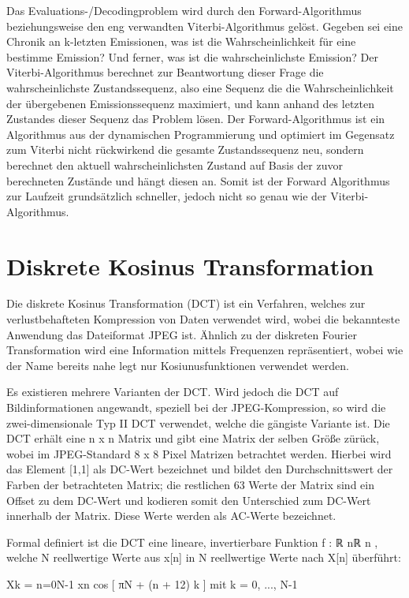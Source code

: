 Das Evaluations-/Decodingproblem wird durch den Forward-Algorithmus beziehungsweise den eng verwandten Viterbi-Algorithmus gelöst. Gegeben sei eine Chronik an k-letzten Emissionen, was ist die Wahrscheinlichkeit für eine bestimme Emission? Und ferner, was ist die wahrscheinlichste Emission? Der Viterbi-Algorithmus berechnet zur Beantwortung dieser Frage die wahrscheinlichste Zustandssequenz, also eine Sequenz die die Wahrscheinlichkeit der übergebenen Emissionssequenz maximiert, und kann anhand des letzten Zustandes dieser Sequenz das Problem lösen. Der Forward-Algorithmus ist ein Algorithmus aus der dynamischen Programmierung und optimiert im Gegensatz zum Viterbi nicht rückwirkend die gesamte Zustandssequenz neu, sondern berechnet den aktuell wahrscheinlichsten Zustand auf Basis der zuvor berechneten Zustände und hängt diesen an. Somit ist der Forward Algorithmus zur Laufzeit grundsätzlich schneller, jedoch nicht so genau wie der Viterbi-Algorithmus.

\section{Diskrete Kosinus Transformation}

Die diskrete Kosinus Transformation (DCT) ist ein Verfahren, welches zur verlustbehafteten Kompression von Daten verwendet wird, wobei die bekannteste Anwendung das Dateiformat JPEG ist. Ähnlich zu der diskreten Fourier Transformation wird eine Information mittels Frequenzen repräsentiert, wobei wie der Name bereits nahe legt nur Kosiunusfunktionen verwendet werden. 

Es existieren mehrere Varianten der DCT. Wird jedoch die DCT auf Bildinformationen angewandt, speziell bei der JPEG-Kompression, so wird die zwei-dimensionale Typ II DCT verwendet, welche die gängiste Variante ist. Die DCT erhält eine n x n Matrix und gibt eine Matrix der selben Größe zürück, wobei im JPEG-Standard 8 x 8 Pixel Matrizen betrachtet werden. Hierbei wird das Element [1,1] als DC-Wert bezeichnet und bildet den Durchschnittswert der Farben der betrachteten Matrix; die restlichen 63 Werte der Matrix sind ein Offset zu dem DC-Wert und kodieren somit den Unterschied zum DC-Wert innerhalb der Matrix. Diese Werte werden als AC-Werte bezeichnet.

Formal definiert ist die DCT eine lineare, invertierbare Funktion f : ℝ nℝ n , welche N reellwertige Werte aus x[n] in N reellwertige Werte nach X[n] überführt:

Xk = n=0N-1 xn cos [ πN + (n + 12) k ] mit k = 0, ..., N-1


